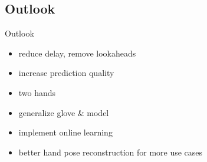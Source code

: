 
\subsection{Outlook}
\begin{frame}{Outlook}
    \begin{itemize}
        \item reduce delay, remove lookaheads
        \item increase prediction quality
        \item two hands
        \item generalize glove \& model
        \item implement online learning
        \item better hand pose reconstruction for more use cases
    \end{itemize}
\end{frame}

